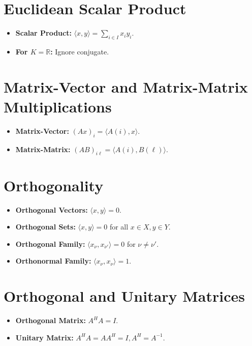 \documentclass{article}
\begin{document}
\section*{Euclidean Scalar Product}
\begin{itemize}
    \item \textbf{Scalar Product:} \( \langle x, y \rangle = \sum_{i \in I} x_i y_i \).
    \item \textbf{For \( K = \mathbb{R} \):} Ignore conjugate.
\end{itemize}

\section*{Matrix-Vector and Matrix-Matrix Multiplications}
\begin{itemize}
    \item \textbf{Matrix-Vector:} \( (Ax)_i = \langle A(i), x \rangle \).
    \item \textbf{Matrix-Matrix:} \( (AB)_{i\ell} = \langle A(i), B(\ell) \rangle \).
\end{itemize}

\section*{Orthogonality}
\begin{itemize}
    \item \textbf{Orthogonal Vectors:} \( \langle x, y \rangle = 0 \).
    \item \textbf{Orthogonal Sets:} \( \langle x, y \rangle = 0 \) for all \( x \in X, y \in Y \).
    \item \textbf{Orthogonal Family:} \( \langle x_\nu, x_{\nu'} \rangle = 0 \) for \( \nu \neq \nu' \).
    \item \textbf{Orthonormal Family:} \( \langle x_\nu, x_\nu \rangle = 1 \).
\end{itemize}

\section*{Orthogonal and Unitary Matrices}
\begin{itemize}
    \item \textbf{Orthogonal Matrix:} \( A^H A = I \).
    \item \textbf{Unitary Matrix:} \( A^H A = AA^H = I, A^H = A^{-1} \).
\end{itemize}
\end{document}
